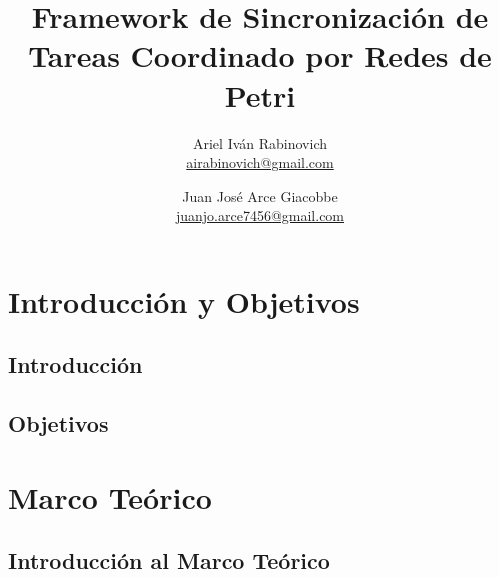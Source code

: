 \documentclass{report}
\date{}
\newcounter{definitionsCounter}
\begin{document}
    \newcommand{\nombreTesis}{Framework de Sincronización de Tareas Coordinado
    por Redes de Petri}
    \newcommand{\nombreFramework}{Baboon}
    \newcommand{\javapetriconcurrencymonitor}{Java Petri Concurrency Monitor }
    
    \newcommand{\repoMonitor}{https://github.com/airabinovich/java_petri_engine.git}
    \newcommand{\repoFramework}{https://github.com/juanjoarce7456/petri_event_dispatcher.git}

    \newcommand{\ResetCounter}{\setcounter{subfigure}{0}}

    \title{\nombreTesis}
    \author{Ariel Iván Rabinovich \\ \href{mailto:airabinovich@gmail.com}{airabinovich@gmail.com}
        \and Juan José Arce Giacobbe \\ \href{mailto:juanjo.arce7546@gmail.com}{juanjo.arce7456@gmail.com}}
    \graphicspath{ {resources/images/} }
    
    \maketitle
    
    \tableofcontents
    
    \listoffigures
    \listoftables
    
    \setcounter{definitionsCounter}{0}
    \part{Introducción y Objetivos}
        \chapter{Introducción}
        
        \chapter{Objetivos}
        
    \part{Marco Teórico}
        \label{cap:marco_teorico}
        \chapter{Introducción al Marco Teórico}
        
\end{document}
